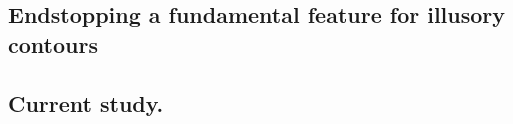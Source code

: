 \documentclass[12pt]{article}
\begin{document}
\subsection{Endstopping a fundamental feature for illusory contours}

\subsection{Current study.}


\end{document}
